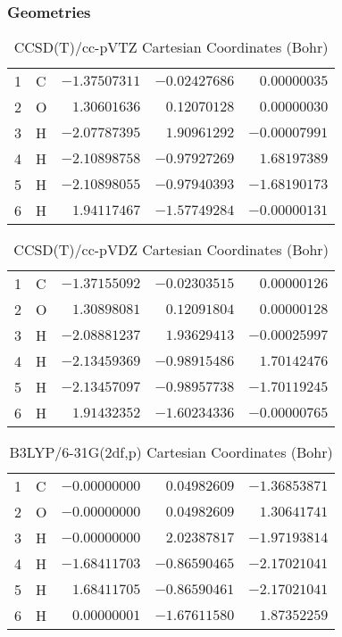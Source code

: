 \documentclass[10pt,oneside]{article}
\begin{document}
\clearpage

\subsection{\ \ \ }

\subsubsection*{Geometries}
\begin{table}[h!]
\centering
\caption{CCSD(T)/cc-pVTZ Cartesian Coordinates (Bohr)}
\begin{tabular}{llrrr}
1  & C  & $-1.37507311$ & $-0.02427686$ & $ 0.00000035$ \\
2  & O  & $ 1.30601636$ & $ 0.12070128$ & $ 0.00000030$ \\
3  & H  & $-2.07787395$ & $ 1.90961292$ & $-0.00007991$ \\
4  & H  & $-2.10898758$ & $-0.97927269$ & $ 1.68197389$ \\
5  & H  & $-2.10898055$ & $-0.97940393$ & $-1.68190173$ \\
6  & H  & $ 1.94117467$ & $-1.57749284$ & $-0.00000131$ \\
\end{tabular}
\end{table}

\begin{table}[h!]
\centering
\caption{CCSD(T)/cc-pVDZ Cartesian Coordinates (Bohr)}
\begin{tabular}{llrrr}
1  & C  & $-1.37155092$ & $-0.02303515$ & $ 0.00000126$ \\
2  & O  & $ 1.30898081$ & $ 0.12091804$ & $ 0.00000128$ \\
3  & H  & $-2.08881237$ & $ 1.93629413$ & $-0.00025997$ \\
4  & H  & $-2.13459369$ & $-0.98915486$ & $ 1.70142476$ \\
5  & H  & $-2.13457097$ & $-0.98957738$ & $-1.70119245$ \\
6  & H  & $ 1.91432352$ & $-1.60234336$ & $-0.00000765$ \\
\end{tabular}
\end{table}

\begin{table}[h!]
\centering
\caption{B3LYP/6-31G(2df,p) Cartesian Coordinates (Bohr)}
\begin{tabular}{llrrr}
1  & C  & $-0.00000000$ & $ 0.04982609$ & $-1.36853871$ \\
2  & O  & $-0.00000000$ & $ 0.04982609$ & $ 1.30641741$ \\
3  & H  & $-0.00000000$ & $ 2.02387817$ & $-1.97193814$ \\
4  & H  & $-1.68411703$ & $-0.86590465$ & $-2.17021041$ \\
5  & H  & $ 1.68411705$ & $-0.86590461$ & $-2.17021041$ \\
6  & H  & $ 0.00000001$ & $-1.67611580$ & $ 1.87352259$ \\
\end{tabular}
\end{table}
\end{document}
